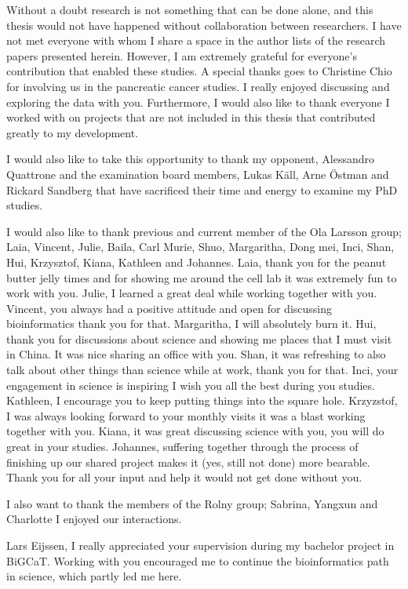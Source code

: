 \documentclass[
  12pt,
  openany]{book}
\begin{document}
Without a doubt research is not something that can be done alone, and this thesis would not have happened without collaboration between researchers. I have not met everyone with whom I share a space in the author lists of the research papers presented herein. However, I am extremely grateful for everyone's contribution that enabled these studies. A special thanks goes to Christine Chio for involving us in the pancreatic cancer studies. I really enjoyed discussing and exploring the data with you. Furthermore, I would also like to thank everyone I worked with on projects that are not included in this thesis that contributed greatly to my development.

I would also like to take this opportunity to thank my opponent, Alessandro Quattrone and the examination board members, Lukas Käll, Arne Östman and Rickard Sandberg that have sacrificed their time and energy to examine my PhD studies.

I would also like to thank previous and current member of the Ola Larsson group; Laia, Vincent, Julie, Baila, Carl Murie, Shuo, Margaritha, Dong mei, Inci, Shan, Hui, Krzysztof, Kiana, Kathleen and Johannes.
Laia, thank you for the peanut butter jelly times and for showing me around the cell lab it was extremely fun to work with you. Julie, I learned a great deal while working together with you. Vincent, you always had a positive attitude and open for discussing bioinformatics thank you for that. Margaritha, I will absolutely burn it. Hui, thank you for discussions about science and showing me places that I must visit in China. It was nice sharing an office with you. Shan, it was refreshing to also talk about other things than science while at work, thank you for that. Inci, your engagement in science is inspiring I wish you all the best during you studies. Kathleen, I encourage you to keep putting things into the square hole. Krzyzstof, I was always looking forward to your monthly visits it was a blast working together with you. Kiana, it was great discussing science with you, you will do great in your studies. Johannes, suffering together through the process of finishing up our shared project makes it (yes, still not done) more bearable. Thank you for all your input and help it would not get done without you.

I also want to thank the members of the Rolny group; Sabrina, Yangxun and Charlotte I enjoyed our interactions.

Lars Eijssen, I really appreciated your supervision during my bachelor project in BiGCaT. Working with you encouraged me to continue the bioinformatics path in science, which partly led me here.
\end{document}
